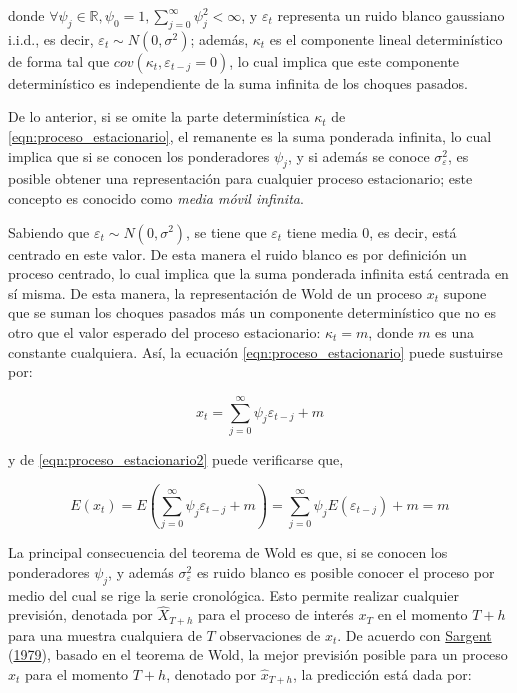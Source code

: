 \documentclass[
]{article}
\begin{document}
donde
\(\forall \psi_j \in \mathbb{R}, \psi_0=1, \sum_{j=0}^{\infty} \psi_j^2<\infty\),
y \(\varepsilon_t\) representa un ruido blanco gaussiano i.i.d., es
decir, \(\varepsilon_t \sim N(0, \sigma^2)\); además, \(\kappa_t\) es el
componente lineal determinístico de forma tal que
\(cov(\kappa_t,\varepsilon_{t-j}=0)\), lo cual implica que este
componente determinístico es independiente de la suma infinita de los
choques pasados.

De lo anterior, si se omite la parte determinística \(\kappa_t\) de
\ref{eqn:proceso_estacionario}, el remanente es la suma ponderada
infinita, lo cual implica que si se conocen los ponderadores \(\psi_j\),
y si además se conoce \(\sigma_\varepsilon^2\), es posible obtener una
representación para cualquier proceso estacionario; este concepto es
conocido como \emph{media móvil infinita}.

Sabiendo que \(\varepsilon_t \sim N(0, \sigma^2)\), se tiene que
\(\varepsilon_t\) tiene media 0, es decir, está centrado en este valor.
De esta manera el ruido blanco es por definición un proceso centrado, lo
cual implica que la suma ponderada infinita está centrada en sí misma.
De esta manera, la representación de Wold de un proceso \(x_t\) supone
que se suman los choques pasados más un componente determinístico que no
es otro que el valor esperado del proceso estacionario: \(\kappa_t=m\),
donde \(m\) es una constante cualquiera. Así, la ecuación
\ref{eqn:proceso_estacionario} puede sustuirse por:

\begin{equation}
\label{eqn:proceso_estacionario2}
x_t=\sum_{j=0}^{\infty} \psi_j\varepsilon_{t-j}+m
\end{equation}

y de \ref{eqn:proceso_estacionario2} puede verificarse que,

\begin{equation}
\label{eqn:dem_proceso_estacionario2}
E(x_t)=E\left(\sum_{j=0}^{\infty} \psi_j\varepsilon_{t-j}+m\right)=\sum_{j=0}^{\infty} \psi_jE\left(\varepsilon_{t-j}\right) + m = m
\end{equation}

La principal consecuencia del teorema de Wold es que, si se conocen los
ponderadores \(\psi_j\), y además \(\sigma_\varepsilon^2\) es ruido
blanco es posible conocer el proceso por medio del cual se rige la serie
cronológica. Esto permite realizar cualquier previsión, denotada por
\(\hat X_{T+h}\) para el proceso de interés \(x_T\) en el momento
\(T+h\) para una muestra cualquiera de \(T\) observaciones de \(x_t\).
De acuerdo con \protect\hyperlink{ref-sargent_macro}{Sargent}
(\protect\hyperlink{ref-sargent_macro}{1979}), basado en el teorema de
Wold, la mejor previsión posible para un proceso \(x_t\) para el momento
\(T+h\), denotado por \(\hat x_{T+h}\), la predicción está dada por:
\end{document}
